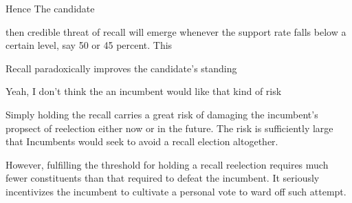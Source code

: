 \documentclass[hyphens, crop=false]{standalone}
\begin{document}
		
		
		
		
		
		
		
%			
		
		
		
		Hence
		The candidate
		
		
		then credible threat of recall will emerge
		whenever the support rate falls below a certain level, say 50 or 45 percent.
		This 
		
		
		
		
		
		
		
		
		
		
		
		
		
		
		
		
		
		
		
		Recall paradoxically improves the candidate's standing
		
		Yeah, I don't think the an incumbent would like that kind of risk
		
		Simply holding the recall carries a great risk of 
		damaging the incumbent's propsect  of reelection either now or in the future.
		The risk is sufficiently large that
		Incumbents would seek to avoid a recall election altogether.
		
		However, fulfilling the threshold for holding a recall reelection
		requires much fewer constituents than that
		required to defeat the incumbent.
		It seriously incentivizes the incumbent to cultivate a personal vote to ward off such attempt.
		
\end{document}
